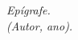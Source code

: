
\renewcommand{\epigraphname}{EPÍGRAFE}

\begin{epigrafe}

\textit{Epígrafe.\\(Autor, ano).}

\end{epigrafe}

